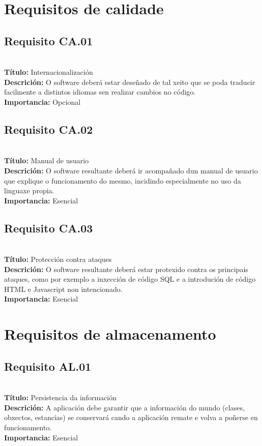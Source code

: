 \section{Requisitos de calidade}
\subsection{Requisito CA.01}~\\
{\bf Título:} Internacionalización\\
{\bf Descrición:} O software deberá estar deseñado de tal xeito que se poda traducir facilmente a distintos idiomas sen realizar cambios no código.\\
{\bf Importancia:} Opcional

\subsection{Requisito CA.02}~\\
{\bf Título:} Manual de usuario\\
{\bf Descrición:} O software resultante deberá ir acompañado dun manual de usuario que explique o funcionamento do mesmo, incidindo especialmente no uso da linguaxe propia.\\
{\bf Importancia:} Esencial

\subsection{Requisito CA.03}~\\
{\bf Título:} Protección contra ataques\\
{\bf Descrición:} O software resultante deberá estar protexido contra os principais ataques, como por exemplo a inxección de código SQL e a introdución de código HTML e Javascript non intencionado.\\
{\bf Importancia:} Esencial

\section{Requisitos de almacenamento}
\subsection{Requisito AL.01}~\\
{\bf Título:} Persistencia da información\\
{\bf Descrición:} A aplicación debe garantir que a información do mundo (clases, obxectos, estancias) se conservará cando a aplicación remate e volva a poñerse en funcionamento.\\
{\bf Importancia:} Esencial

